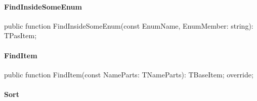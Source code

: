 \documentclass{report}
\newif\ifpdf
\begin{document}
\paragraph*{FindInsideSomeEnum}\hspace*{\fill}

\label{PasDoc_Items.TPasUnit-FindInsideSomeEnum}
\begin{list}{}{
\setlength{\itemindent}{0cm}
\setlength{\listparindent}{0cm}
\setlength{\leftmargin}{\evensidemargin}
\addtolength{\leftmargin}{\tmplength}
\settowidth{\labelsep}{X}
\addtolength{\leftmargin}{\labelsep}
\setlength{\labelwidth}{\tmplength}
}
\item[\textbf{Declaration}\hfill]
\ifpdf
\begin{flushleft}
\fi
\begin{ttfamily}
public function FindInsideSomeEnum(const EnumName, EnumMember: string): TPasItem;\end{ttfamily}

\ifpdf
\end{flushleft}
\fi

\end{list}
\paragraph*{FindItem}\hspace*{\fill}

\label{PasDoc_Items.TPasUnit-FindItem}
\begin{list}{}{
\setlength{\itemindent}{0cm}
\setlength{\listparindent}{0cm}
\setlength{\leftmargin}{\evensidemargin}
\addtolength{\leftmargin}{\tmplength}
\settowidth{\labelsep}{X}
\addtolength{\leftmargin}{\labelsep}
\setlength{\labelwidth}{\tmplength}
}
\item[\textbf{Declaration}\hfill]
\ifpdf
\begin{flushleft}
\fi
\begin{ttfamily}
public function FindItem(const NameParts: TNameParts): TBaseItem; override;\end{ttfamily}

\ifpdf
\end{flushleft}
\fi

\end{list}
\paragraph*{Sort}\hspace*{\fill}
\end{document}
